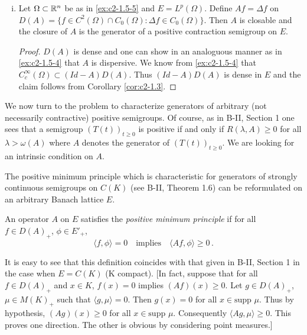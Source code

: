 \begin{examples}
\begin{enumerate}[(i), wide, labelsep=1em, itemindent=\parindent]
\item \label{ex:c2-1.5_6}   
Let $\Omega \subset \mathbb{R}^{n}$ be as in \ref{ex:c2-1.5-5}   and $E = L^{p}(\Omega)$.
Define $Af = \Delta f$ on $D(A) = \{f \in C^{2}(\Omega) \cap C_{0}(\Omega) \colon \Delta f \in C_{0}(\Omega)\}$.
Then $A$ is closable and the closure of $A$ is the generator of a positive contraction semigroup on $E$.
\begin{proof}
$D(A)$ is dense and one can show in an analoguous manner as in \ref{ex:c2-1.5-4}   that $A$ is dispersive.
We know from \ref{ex:c2-1.5-4}   that $C_{c}^{\infty}(\Omega) \subset (Id - A)D(A)$.
Thus $(Id - A)D(A)$ is dense in $E$ and the claim follows from Corollary \ref{cor:c2-1.3}.
\end{proof}
\end{enumerate}
\end{examples}

We now turn to the problem to characterize generators of arbitrary (not necessarily contractive) positive semigroups.
Of course, as in B-II, Section 1 
one sees that a semigroup $(T(t))_{t \geq 0}$ is positive if and only if $R(\lambda,A) \geq 0$ for all $\lambda > \omega(A)$ where $A$ denotes the generator of $(T(t))_{t \geq 0}$.
We are looking for an intrinsic condition on $A$.

The positive minimum principle which is characteristic for generators of strongly continuous semigroups on $C(K)$ (see 
B-II, Theorem 1.6) can be reformulated on an arbitrary Banach lattice $E$.

\begin{definition}\label{def:c2-1.6}
An operator $A$ on $E$ satisfies the \emph{positive minimum principle} if for all $f \in D(A)_{+}$, $\phi \in E'_{+}$,
\begin{equation}\label{eq:c2-P} \tag{P}
\langle f,\phi \rangle = 0 \quad \text{implies} \quad \langle Af,\phi \rangle \geq 0 \,.
\end{equation}
\end{definition}

\begin{remark*}\label{rem:c2-1.6}
It is easy to see that this definition coincides with that given in B-II, Section 1 
in the case when $E = C(K)$ (K compact).
[In fact, suppose that for all $f \in D(A)_{+}$ and $x \in K$, $f(x) = 0$ implies $(Af)(x) \geq 0$.
Let $g \in D(A)_{+}$, $\mu \in M(K)_{+}$ such that $\langle g,\mu \rangle = 0$.
Then $g(x) = 0$ for all $x \in \text{supp } \mu$.
Thus by hypothesis, $(Ag)(x) \geq 0$ for all $x \in \text{supp } \mu$.
Consequently $\langle Ag,\mu \rangle \geq 0$.
This proves one direction.
The other is obvious by considering point measures.]
\end{remark*}

